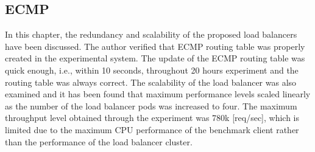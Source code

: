 \subsection{ECMP}

In this chapter, the redundancy and scalability of the proposed load balancers have been discussed.
The author verified that ECMP routing table was properly created in the experimental system.
The update of the ECMP routing table was quick enough, i.e., within 10 seconds, throughout 20 hours experiment and the routing table was always correct.
The scalability of the load balancer was also examined and it has been found that maximum performance levels scaled linearly as the number of the load balancer pods was increased to four.
The maximum throughput level obtained through the experiment was 780k [req/sec], which is limited due to the maximum CPU performance of the benchmark client rather than the performance of the load balancer cluster.


